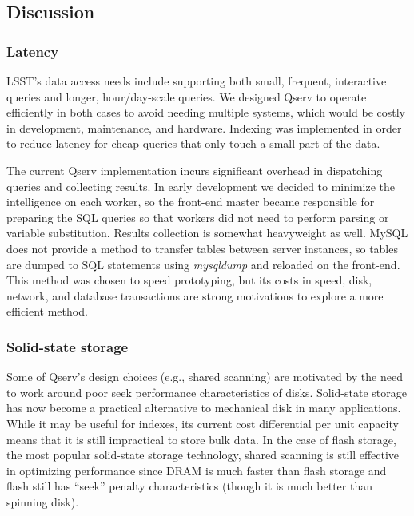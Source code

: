 \documentclass[DM,toc]{lsstdoc}
\begin{document}
\subsection{Discussion}\label{discussion-1}

\subsubsection{Latency}\label{latency}

LSST's data access needs include supporting both small, frequent,
interactive queries and longer, hour/day-scale queries. We designed
Qserv to operate efficiently in both cases to avoid needing multiple
systems, which would be costly in development, maintenance, and
hardware. Indexing was implemented in order to reduce latency for cheap
queries that only touch a small part of the data.

The current Qserv implementation incurs significant overhead in
dispatching queries and collecting results. In early development we
decided to minimize the intelligence on each worker, so the front-end
master became responsible for preparing the SQL queries so that workers
did not need to perform parsing or variable substitution. Results
collection is somewhat heavyweight as well. MySQL does not provide a
method to transfer tables between server instances, so tables are dumped
to SQL statements using \emph{mysqldump} and reloaded on the front-end.
This method was chosen to speed prototyping, but its costs in speed,
disk, network, and database transactions are strong motivations to
explore a more efficient method.

\subsubsection{Solid-state storage}\label{solid-state-storage}

Some of Qserv's design choices (e.g., shared scanning) are motivated by
the need to work around poor seek performance characteristics of disks.
Solid-state storage has now become a practical alternative to mechanical
disk in many applications. While it may be useful for indexes, its
current cost differential per unit capacity means that it is still
impractical to store bulk data. In the case of flash storage, the most
popular solid-state storage technology, shared scanning is still
effective in optimizing performance since DRAM is much faster than flash
storage and flash still has ``seek'' penalty characteristics (though it
is much better than spinning disk).
\end{document}
